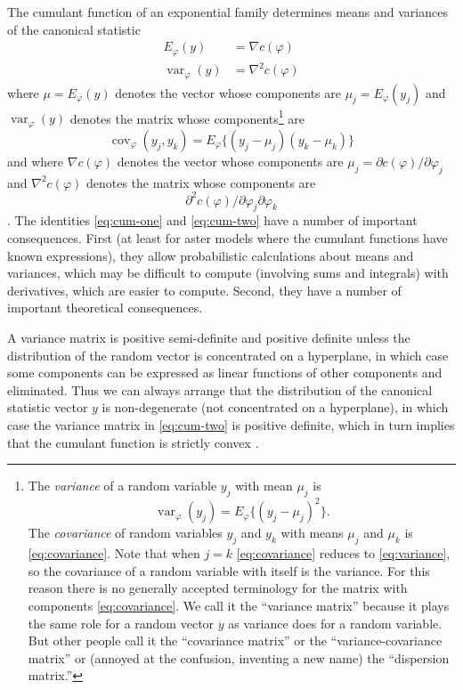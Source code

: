 \documentclass[11pt]{article}
\DeclareMathOperator{\var}{var}
\DeclareMathOperator{\cov}{cov}
\begin{document}
The cumulant function of an exponential family determines means and variances
of the canonical statistic
\begin{subequations}
\begin{align}
   E_\varphi(y) & = \nabla c(\varphi)
   \label{eq:cum-one}
   \\
   \var_\varphi(y) & = \nabla^2 c(\varphi)
   \label{eq:cum-two}
\end{align}
\end{subequations}
where $\mu = E_\varphi(y)$ denotes the vector
whose components are $\mu_j = E_\varphi(y_j)$ and $\var_\varphi(y)$ denotes
the matrix whose components\footnote{The \emph{variance} of a random variable
$y_j$ with mean $\mu_j$ is
\begin{equation} \label{eq:variance}
   \var_\varphi(y_j) = E_\varphi\{ (y_j - \mu_j)^2 \}.
\end{equation}
The \emph{covariance} of random variables $y_j$ and $y_k$ with means $\mu_j$
and $\mu_k$ is \eqref{eq:covariance}.  Note that when $j = k$
\eqref{eq:covariance} reduces to \eqref{eq:variance}, so the covariance of
a random variable with itself is the variance.  For this reason there is no
generally accepted terminology for the matrix with components
\eqref{eq:covariance}.  We call it the ``variance matrix'' because it plays
the same role for a random vector $y$ as variance does for a random variable.
But other people call it the ``covariance matrix'' or the ``variance-covariance
matrix'' or (annoyed at the confusion, inventing a new name) the ``dispersion
matrix.''}
are
\begin{equation} \label{eq:covariance}
   \cov_\varphi(y_j, y_k) = E_\varphi\{ (y_j - \mu_j) (y_k - \mu_k) \}
\end{equation}
and where $\nabla c(\varphi)$ denotes the vector
whose components are $\mu_j = \partial c(\varphi) / \partial \varphi_j$
and $\nabla^2 c(\varphi)$ denotes the matrix whose components
are
$$
   \partial^2 c(\varphi) / \partial \varphi_j \partial \varphi_k
$$
\citep[Theorem~8.1]{barndorff-nielsen}.  The identities \eqref{eq:cum-one}
and \eqref{eq:cum-two} have a number of important consequences.  First
(at least for aster models where the cumulant functions have known expressions),
they allow probabilistic calculations about means and variances, which may
be difficult to compute (involving sums and integrals) with derivatives,
which are easier to compute.
Second, they have a number of important theoretical consequences.

A variance matrix is positive semi-definite and positive definite unless
the distribution of the random vector is concentrated on
a hyperplane, in which case some components can be expressed as linear
functions of other components and eliminated.  Thus we can always arrange
that the distribution of the canonical statistic vector $y$ is non-degenerate
(not concentrated on a hyperplane), in which case the variance matrix in
\eqref{eq:cum-two} is positive definite, which in turn implies that the
cumulant function is strictly convex \citep[Theorem~2.14]{rockafellar-wets}.
\end{document}

